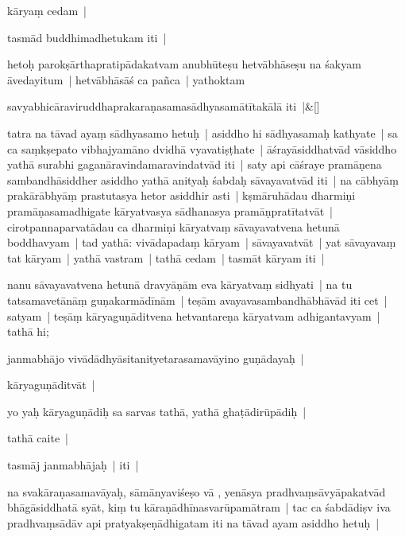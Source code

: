 \documentclass[article,12pt,a4paper]{memoir}
\newcommand{\deletion}[1]{($^{-}$#1)}
\begin{document}
	  \pstart kāryaṃ cedam |
	\pend
      

	  \pstart tasmād buddhimadhetukam iti |
	\pend
      

	  \pstart hetoḥ parokṣārthapratipādakatvam anubhūteṣu hetvābhāseṣu na śakyam āvedayitum | hetvābhāsāś ca pañca | yathoktam
	\pend
      
	    
	    \stanza[\smallbreak]
	savyabhicāraviruddhaprakaraṇasamasādhyasamātītakālā iti |\&[\smallbreak]


	

	  \pstart tatra na tāvad ayaṃ sādhyasamo hetuḥ | asiddho hi sādhyasamaḥ kathyate | sa ca saṃkṣepato vibhajyamāno dvidhā vyavatiṣṭhate | āśrayāsiddhatvād vāsiddho yathā surabhi gaganāravindamaravindatvād iti | saty api cāśraye pramāṇena sambandhāsiddher asiddho yathā anityaḥ śabdaḥ sāvayavatvād iti | na cābhyāṃ prakārābhyāṃ prastutasya hetor asiddhir asti | \label{ratnakīrtinibandhāvali__36r1N54T2H6NLF3JHCUF8B8TWUQ}kṣmāruhādau dharmiṇi pramāṇasamadhigate kāryatvasya sādhanasya pramāṇpratītatvāt | cirotpannaparvatādau ca dharmiṇi kāryatvaṃ sāvayavatvena hetunā boddhavyam | tad yathā: vivādapadaṃ kāryam | sāvayavatvāt | yat sāvayavaṃ tat kāryam | yathā vastram | tathā cedam | tasmāt kāryam iti |
	\pend
      

	  \pstart nanu sāvayavatvena hetunā dravyāṇām eva kāryatvaṃ sidhyati | na tu tatsamavetānāṃ guṇakarmādīnām | teṣām avayavasambandhābhāvād iti cet | satyam | teṣāṃ kāryaguṇāditvena hetvantareṇa kāryatvam adhigantavyam | tathā hi; 
	\pend
      

	  \pstart janmabhājo vivādādhyāsitanityetarasamavāyino guṇādayaḥ |
	\pend
      

	  \pstart kāryaguṇāditvāt |
	\pend
      

	  \pstart yo yaḥ kāryaguṇādiḥ sa sarvas tathā, yathā ghaṭādirūpādiḥ |
	\pend
      

	  \pstart tathā caite |
	\pend
      

	  \pstart tasmāj janmabhājaḥ | iti |
	\pend
      

	  \pstart {} na svakāraṇasamavāyaḥ, sāmānyaviśeṣo vā \edtext{}{\lemma{---}\Afootnote{boddhavyaṃ\deletion{ḥ} \cite{RNAms:18b6} ; boddhavyaḥ \cite{ĪSD:33.18} }}, yenāsya pradhvaṃsāvyāpakatvād bhāgāsiddhatā syāt, kiṃ tu kāraṇādhīnasvarūpamātram | tac ca śabdādiṣv iva pradhvaṃsādāv api pratyakṣeṇādhigatam iti na tāvad ayam asiddho hetuḥ |
	\pend
      
\end{document}
